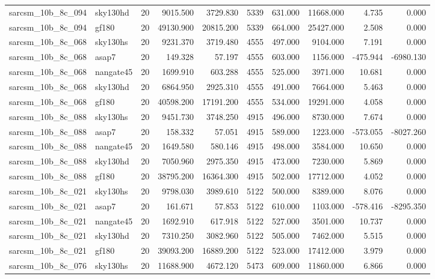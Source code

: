 \begin{tabular}{llrrrrrrrr}
sarcsm\_10b\_8c\_094 & sky130hd & 20 & 9015.500 & 3729.830 & 5339 & 631.000 & 11668.000 & 4.735 & 0.000 \\
sarcsm\_10b\_8c\_094 & gf180 & 20 & 49130.900 & 20815.200 & 5339 & 664.000 & 25427.000 & 2.508 & 0.000 \\
sarcsm\_10b\_8c\_068 & sky130hs & 20 & 9231.370 & 3719.480 & 4555 & 497.000 & 9104.000 & 7.191 & 0.000 \\
sarcsm\_10b\_8c\_068 & asap7 & 20 & 149.328 & 57.197 & 4555 & 603.000 & 1156.000 & -475.944 & -6980.130 \\
sarcsm\_10b\_8c\_068 & nangate45 & 20 & 1699.910 & 603.288 & 4555 & 525.000 & 3971.000 & 10.681 & 0.000 \\
sarcsm\_10b\_8c\_068 & sky130hd & 20 & 6864.950 & 2925.310 & 4555 & 491.000 & 7664.000 & 5.463 & 0.000 \\
sarcsm\_10b\_8c\_068 & gf180 & 20 & 40598.200 & 17191.200 & 4555 & 534.000 & 19291.000 & 4.058 & 0.000 \\
sarcsm\_10b\_8c\_088 & sky130hs & 20 & 9451.730 & 3748.250 & 4915 & 496.000 & 8730.000 & 7.674 & 0.000 \\
sarcsm\_10b\_8c\_088 & asap7 & 20 & 158.332 & 57.051 & 4915 & 589.000 & 1223.000 & -573.055 & -8027.260 \\
sarcsm\_10b\_8c\_088 & nangate45 & 20 & 1649.580 & 580.146 & 4915 & 498.000 & 3584.000 & 10.650 & 0.000 \\
sarcsm\_10b\_8c\_088 & sky130hd & 20 & 7050.960 & 2975.350 & 4915 & 473.000 & 7230.000 & 5.869 & 0.000 \\
sarcsm\_10b\_8c\_088 & gf180 & 20 & 38795.200 & 16364.300 & 4915 & 502.000 & 17712.000 & 4.052 & 0.000 \\
sarcsm\_10b\_8c\_021 & sky130hs & 20 & 9798.030 & 3989.610 & 5122 & 500.000 & 8389.000 & 8.076 & 0.000 \\
sarcsm\_10b\_8c\_021 & asap7 & 20 & 161.671 & 57.853 & 5122 & 610.000 & 1103.000 & -578.416 & -8295.350 \\
sarcsm\_10b\_8c\_021 & nangate45 & 20 & 1692.910 & 617.918 & 5122 & 527.000 & 3501.000 & 10.737 & 0.000 \\
sarcsm\_10b\_8c\_021 & sky130hd & 20 & 7310.250 & 3082.960 & 5122 & 505.000 & 7462.000 & 5.515 & 0.000 \\
sarcsm\_10b\_8c\_021 & gf180 & 20 & 39093.200 & 16889.200 & 5122 & 523.000 & 17412.000 & 3.979 & 0.000 \\
sarcsm\_10b\_8c\_076 & sky130hs & 20 & 11688.900 & 4672.120 & 5473 & 609.000 & 11860.000 & 6.866 & 0.000 \\

\end{tabular}
